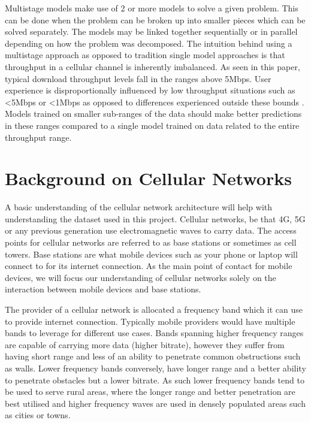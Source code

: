 Multistage models make use of 2 or more models to solve a given problem. This can be done when the problem can be broken up into smaller pieces which can be solved separately. The models may be linked together sequentially or in parallel depending on how the problem was decomposed. The intuition behind using a multistage approach as opposed to tradition single model approaches is that throughput in a cellular channel is inherently imbalanced. As seen in this paper, typical download throughput levels fall in the ranges above 5Mbps. User experience is disproportionally influenced by low throughput situations such as <5Mbps or <1Mbps as opposed to differences experienced outside these bounds \cite{raca2019improving}. Models trained on smaller sub-ranges of the data should make better predictions in these ranges compared to a single model trained on data related to the entire throughput range.

\section{Background on Cellular Networks}

A basic understanding of the cellular network architecture will help with understanding the dataset used in this project. Cellular networks, be that 4G, 5G or any previous generation use electromagnetic waves to carry data. The access points for cellular networks are referred to as base stations or sometimes as cell towers. Base stations are what mobile devices such as your phone or laptop will connect to for its internet connection. As the main point of contact for mobile devices, we will focus our understanding of cellular networks solely on the interaction between mobile devices and base stations.

The provider of a cellular network is allocated a frequency band which it can use to provide internet connection. Typically mobile providers would have multiple bands to leverage for different use cases. Bands spanning higher frequency ranges are capable of carrying more data (higher bitrate), however they suffer from having short range and less of an ability to penetrate  common obstructions such as walls. Lower frequency bands conversely, have longer range and a better ability to penetrate obstacles but a lower bitrate. As such lower frequency bands tend to be used to serve rural areas, where the longer range and better penetration are best utilised and higher frequency waves are used in densely populated areas such as cities or towns.

